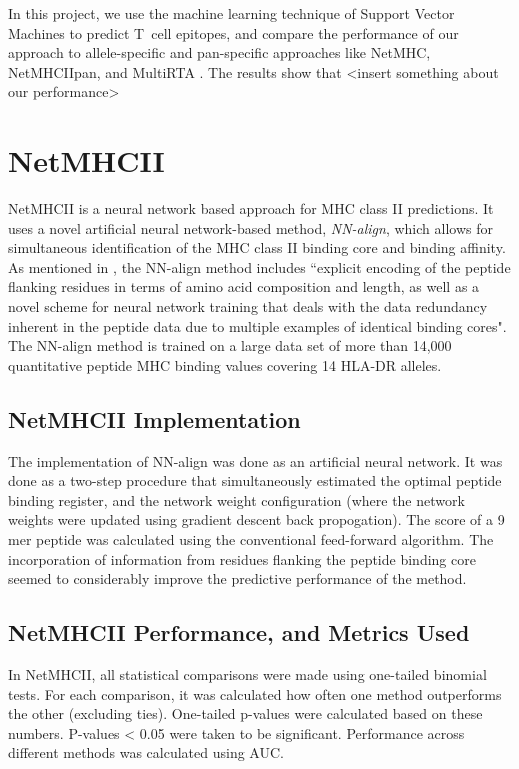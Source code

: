 \documentclass[journal]{IEEEtran}
\begin{document}
In this project, we use the machine learning technique of Support Vector Machines to predict T~cell epitopes, and compare the performance of our approach to allele-specific and pan-specific approaches like NetMHC, NetMHCIIpan, and MultiRTA \cite{MultiRTA}. The results show that <insert something about our performance>


\section{NetMHCII}
NetMHCII is a neural network based approach for MHC class II predictions. It uses a novel artificial neural network-based method, \textit{NN-align}, which allows for simultaneous identification of the MHC class II binding core and binding affinity. As mentioned in \cite{NetMHCII}, the NN-align method includes ``explicit encoding of the peptide flanking residues in terms of amino acid composition and length, as well as a novel scheme for neural network training that deals with the data redundancy inherent in the peptide data due to multiple examples of identical binding cores". The NN-align method is trained on a large data set of more than 14,000 quantitative peptide MHC binding values covering 14 HLA-DR alleles.

\subsection{NetMHCII Implementation}
The implementation of NN-align was done as an artificial neural network. It was done as a two-step procedure that simultaneously estimated the optimal peptide binding register, and the network weight configuration (where the network weights were updated using gradient descent back propogation). The score of a 9 mer peptide was calculated using the conventional feed-forward algorithm. The incorporation of information from residues flanking the peptide binding core seemed to considerably improve the predictive performance of the method. 



\subsection{NetMHCII Performance, and Metrics Used}
In NetMHCII, all statistical comparisons were made using one-tailed binomial tests. For each comparison, it was calculated how often one method outperforms the other (excluding ties). One-tailed p-values were calculated based on these numbers. P-values < 0.05 were taken to be significant. Performance across different methods was calculated using AUC.
\end{document}
